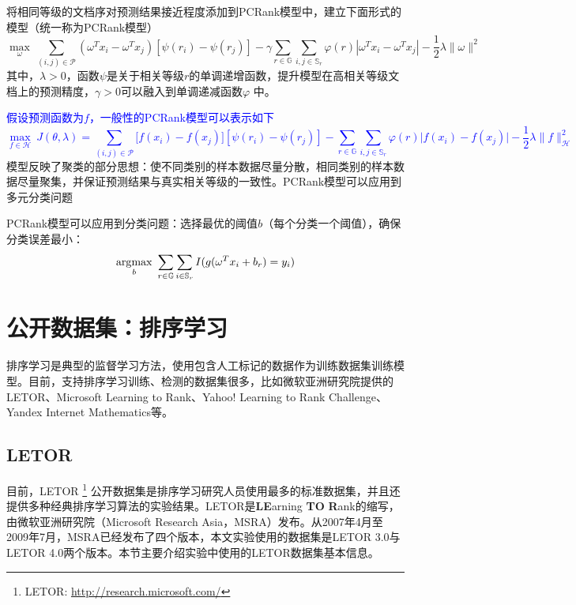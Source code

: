 将相同等级的文档序对预测结果接近程度添加到PCRank模型中，建立下面形式的模型（统一称为PCRank模型）
\begin{equation}
    \max\limits_{\omega} ~ \sum\limits_{(i,j)\in \mathscr P} (\omega^T x_i - \omega^T x_j) [\psi(r_i)-\psi(r_j)] - \gamma \sum\limits_{r\in \mathbb{G}} \sum\limits_{i, j\in \mathbb{S}_r} \varphi(r) |\omega^T x_i - \omega^T x_j| - \frac{1}{2} \lambda \|\omega\|^2
\end{equation}
其中，$\lambda>0$，函数$\psi$是关于相关等级$r$的单调递增函数，提升模型在高相关等级文档上的预测精度，$\gamma>0$可以融入到单调递减函数$\varphi$ 中。

\textcolor{blue}{
假设预测函数为$f$，一般性的PCRank模型可以表示如下
\begin{equation}
    \max\limits_{f\in \mathcal H} ~ J(\theta,\lambda) = \sum\limits_{(i,j)\in \mathscr P} \big[f(x_i) - f(x_j)\big] [\psi(r_i)-\psi(r_j)] - \sum\limits_{r\in \mathbb G} \sum\limits_{i, j\in \mathbb{S}_r} \varphi(r) \big|f(x_i) - f(x_j)\big| - \frac{1}{2} \lambda \|f\|_\mathcal{H}^2
\end{equation}
}
模型反映了聚类的部分思想：使不同类别的样本数据尽量分散，相同类别的样本数据尽量聚集，并保证预测结果与真实相关等级的一致性。PCRank模型可以应用到多元分类问题

PCRank模型可以应用到分类问题：选择最优的阈值$b$（每个分类一个阈值），确保分类误差最小：
\begin{equation}
    \operatorname*{\mathrm{\arg\!\max}}\limits_{b} ~\sum\limits_{r\in \mathbb{G}} \sum\limits_{i\in \mathbb{S}_r} I(g(\omega^T x_i + b_r) = y_i)
\end{equation}

\section{公开数据集：排序学习}
排序学习是典型的监督学习方法，使用包含人工标记的数据作为训练数据集训练模型。目前，支持排序学习训练、检测的数据集很多，比如微软亚洲研究院提供的LETOR\cite{qin2010letor}、Microsoft Learning to Rank、Yahoo! Learning to Rank Challenge、Yandex Internet Mathematics等。

\subsection{LETOR}
目前，LETOR
\footnote{LETOR: \href{http://research.microsoft.com/en-us/um/beijing/projects/letor/}{http://research.microsoft.com/}}
公开数据集是排序学习研究人员使用最多的标准数据集，并且还提供多种经典排序学习算法的实验结果。LETOR是\textbf{LE}arning \textbf{TO} \textbf{R}ank的缩写，由微软亚洲研究院（Microsoft Research Asia，MSRA）发布。从2007年4月至2009年7月，MSRA已经发布了四个版本，本文实验使用的数据集是LETOR 3.0与LETOR 4.0两个版本。本节主要介绍实验中使用的LETOR数据集基本信息。

